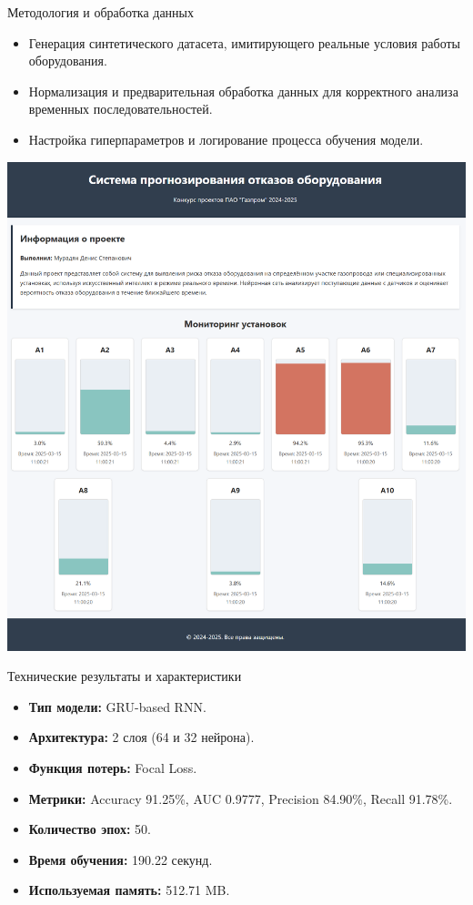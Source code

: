 \documentclass[aspectratio=169]{beamer}
\begin{document}
\begin{frame}{Методология и обработка данных}
  \begin{itemize}
    \item Генерация синтетического датасета, имитирующего реальные условия работы оборудования.
    \item Нормализация и предварительная обработка данных для корректного анализа временных последовательностей.
    \item Настройка гиперпараметров и логирование процесса обучения модели.
  \end{itemize}
  \vspace{0.3cm}
  \centering
  \includegraphics[width=0.5\linewidth]{../../Include/dashboard.png}
\end{frame}

\begin{frame}{Технические результаты и характеристики}
  \begin{itemize}
    \item \textbf{Тип модели:} GRU-based RNN.
    \item \textbf{Архитектура:} 2 слоя (64 и 32 нейрона).
    \item \textbf{Функция потерь:} Focal Loss.
    \item \textbf{Метрики:} Accuracy 91.25\%, AUC 0.9777, Precision 84.90\%, Recall 91.78\%.
    \item \textbf{Количество эпох:} 50.
    \item \textbf{Время обучения:} 190.22 секунд.
    \item \textbf{Используемая память:} 512.71 MB.
  \end{itemize}
\end{frame}
\end{document}
